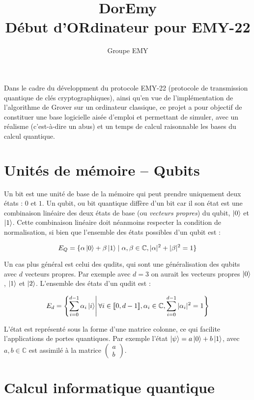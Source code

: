 \documentclass[french]{article}
\title{%
    DorEmy \\
    \large Début d'ORdinateur pour EMY-22}
\author{Groupe EMY}
\newcommand{\somme}{\displaystyle\sum}
\begin{document}
\maketitle

Dans le cadre du développment du protocole EMY-22 (protocole de transmission quantique de clés cryptographiques), ainsi qu'en vue de l'implémentation de l'algorithme de Grover sur un ordinateur classique, ce projet a pour objectif de constituer une base logicielle aisée d'emploi et permettant de simuler, avec un réalisme (c'est-à-dire un abus) et un temps de calcul raisonnable les bases du calcul quantique.


\section{Unités de mémoire – Qubits}

Un bit est une unité de base de la mémoire qui peut prendre uniquement deux états : $0$ et $1$. Un qubit, ou bit quantique diffère d'un bit car il son état est une combinaison linéaire des deux états de base (ou \textit{vecteurs propres}) du qubit, $\ket{0}$ et $\ket{1}$. Cette combinaison linéaire doit néanmoins respecter la condition de normalisation, si bien que l'ensemble des états possibles d'un qubit est :

\[ E_Q = \{\alpha \ket 0 + \beta \ket 1 \mid \alpha, \beta \in \mathbb{C}, |\alpha|^2 + |\beta|^2 = 1\} \]

Un cas plus général est celui des qudits, qui sont une généralisation des qubits avec $d$ vecteurs propres. Par exemple avec $d = 3$ on aurait les vecteurs propres $\ket 0$, $\ket 1$ et $\ket 2$. L'ensemble des états d'un qudit est :

$$ E_d = \left\{ \somme_{i = 0}^{d - 1} \alpha_i \ket i \middle|\, \forall i \in \llbracket 0, d-1 \rrbracket, \alpha_i \in \mathbb{C},  \somme_{i = 0}^{d - 1} |\alpha_i|^2 = 1\right\} $$

L'état est représenté sous la forme d'une matrice colonne, ce qui facilite l'applications de portes quantiques. Par exemple l'état $\ket \psi = a \ket 0 + b \ket 1$, avec $a, b \in \mathbb{C}$ est assimilé à la matrice $\left(\begin{smallmatrix} a \\ b\end{smallmatrix}\right)$.


\section{Calcul informatique quantique}
\end{document}
